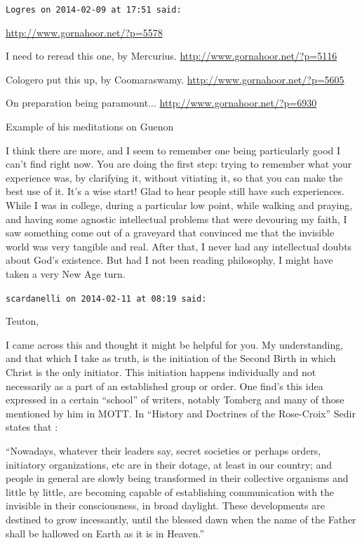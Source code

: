 \begin{footnotesize}
\begin{sffamily}
\hfill

\texttt{Logres on 2014-02-09 at 17:51 said:}

\url{http://www.gornahoor.net/?p=5578}

I need to reread this one, by Mercurius.
\url{http://www.gornahoor.net/?p=5116}

Cologero put this up, by Coomaraswamy.
\url{http://www.gornahoor.net/?p=5605}

On preparation being paramount... 
\url{http://www.gornahoor.net/?p=6930}

Example of his meditations on Guenon

I think there are more, and I seem to remember one being particularly good I can't find right now. You are doing the first step: trying to remember what your experience was, by clarifying it, without vitiating it, so that you can make the best use of it. It's a wise start! Glad to hear people still have such experiences. While I was in college, during a particular low point, while walking and praying, and having some agnostic intellectual problems that were devouring my faith, I saw something come out of a graveyard that convinced me that the invisible world was very tangible and real. After that, I never had any intellectual doubts about God's existence. But had I not been reading philosophy, I might have taken a very New Age turn.

\hfill

\texttt{scardanelli on 2014-02-11 at 08:19 said:}

Teuton,

I came across this and thought it might be helpful for you. My understanding, and that which I take as truth, is the initiation of the Second Birth in which Christ is the only initiator. This initiation happens individually and not necessarily as a part of an established group or order. One find's this idea expressed in a certain ``school'' of writers, notably Tomberg and many of those mentioned by him in MOTT. In ``History and Doctrines of the Rose-Croix'' Sedir states that :

``Nowadays, whatever their leaders say, secret societies or perhaps orders, initiatory organizations, etc are in their dotage, at least in our country; and people in general are slowly being transformed in their collective organisms and little by little, are becoming capable of establishing communication with the invisible in their consciousness, in broad daylight. These developments are destined to grow incessantly, until the blessed dawn when the name of the Father shall be hallowed on Earth as it is in Heaven.''


\end{sffamily}
\end{footnotesize}
